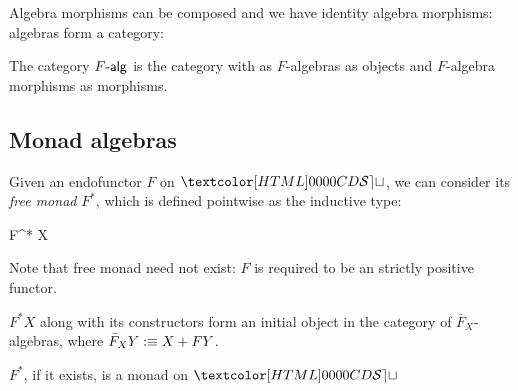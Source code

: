 Algebra morphisms can be composed and we have identity algebra
morphisms: algebras form a category:

\begin{definition}
  The category $\algcat{F}$ is the category with as $F$-algebras as
  objects and $F$-algebra morphisms as morphisms.
\end{definition}

\subsection{Monad algebras}

Given an endofunctor $F$ on $\SET$, we can consider its \emph{free
  monad} $F^*$, which is defined pointwise as the inductive type:

\begin{datatype}{F^* X}{\Set}
   \\
\end{datatype}

Note that free monad need not exist: $F$ is required to be an strictly
positive functor.

$F^* X$ along with its constructors form an initial object in the
category of $\bar{F}_X$-algebras, where $\bar{F}_X Y :\equiv X + FY$.

\begin{proposition}
  \label{free-monad-thm}
  $F^*$, if it exists, is a monad on $\SET$
\end{proposition}

